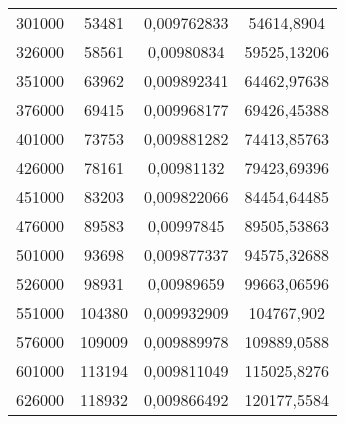 \documentclass[a4paper,12pt]{article} %
\begin{document}
\begin{table}[H]
{\begin{tabular}{|c|c|c|c|}
			301000                                             & 53481                & 0,009762833          & 54614,8904                               \\
			326000                                             & 58561                & 0,00980834           & 59525,13206                              \\
			351000                                             & 63962                & 0,009892341          & 64462,97638                              \\
			376000                                             & 69415                & 0,009968177          & 69426,45388                              \\
			401000                                             & 73753                & 0,009881282          & 74413,85763                              \\
			426000                                             & 78161                & 0,00981132           & 79423,69396                              \\
			451000                                             & 83203                & 0,009822066          & 84454,64485                              \\
			476000                                             & 89583                & 0,00997845           & 89505,53863                              \\
			501000                                             & 93698                & 0,009877337          & 94575,32688                              \\
			526000                                             & 98931                & 0,00989659           & 99663,06596                              \\
			551000                                             & 104380               & 0,009932909          & 104767,902                               \\
			576000                                             & 109009               & 0,009889978          & 109889,0588                              \\
			601000                                             & 113194               & 0,009811049          & 115025,8276                              \\
			626000                                             & 118932               & 0,009866492          & 120177,5584                              \\

\end{tabular}}
\end{table}
\end{document}
